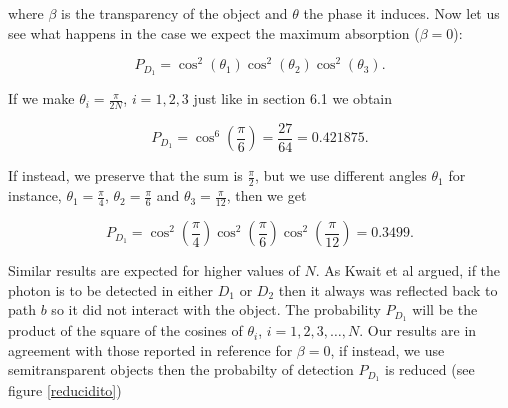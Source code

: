 \documentclass[12pt]{book}
\begin{document}
where $\beta$ is the transparency of the object and $\theta$ the phase it induces. Now let us see what happens in the case we expect the maximum absorption ($\beta=0$): 

\begin{equation}
P_{D_{1}}=\cos^{2}{\left(\theta_{1} \right)} \cos^{2}{\left(\theta_{2} \right)} \cos^{2}{\left(\theta_{3} \right)}.
\end{equation}

If we make $\theta_{i}=\frac{\pi}{2N}$, $i=1, 2, 3$ just like in section 6.1 we obtain

\begin{equation}
P_{D_{1}}=\cos^{6}{\left(\frac{\pi}{6} \right)}=\frac{27}{64}=0.421875.
\end{equation} 

If instead, we preserve that the sum is $\frac{\pi}{2}$,  but we use different angles $\theta_{1}$ for instance, $\theta_{1}=\frac{\pi}{4}$, $\theta_{2}=\frac{\pi}{6}$ and $\theta_{3}=\frac{\pi}{12}$, then we get 

\begin{equation}
P_{D_{1}}=\cos^{2}{\left(\frac{\pi}{4} \right)} \cos^{2}{\left(\frac{\pi}{6} \right)} \cos^{2}{\left(\frac{\pi}{12} \right)}=0.3499.
\end{equation}

Similar results are expected for higher values of $N$. As Kwait et al \cite{exp} argued, if the photon is to be detected in either $D_{1}$ or $D_{2}$ then it always was reflected back to path $b$ so it did not interact with the object. The probability $P_{D_{1}}$ will be the product of the square of the cosines of $\theta_{i}$, $i=1,2,3,\dots,N$. Our results are in agreement with those reported in reference \cite{exp} for $\beta=0$, if instead, we use semitransparent objects then the probabilty of detection $P_{D_{1}}$ is reduced (see figure \ref{reducidito})
\end{document}

